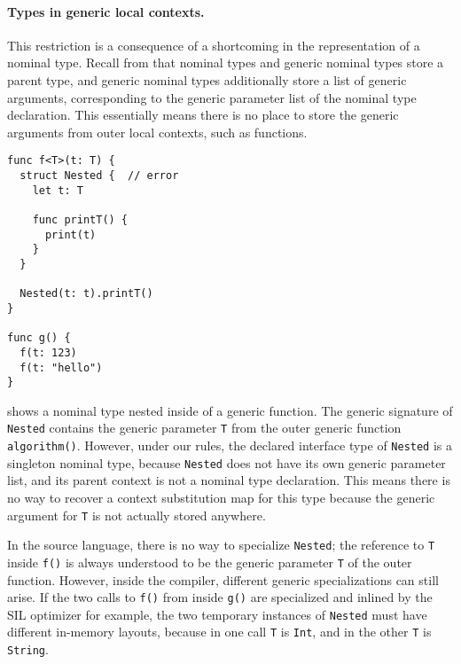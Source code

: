 \documentclass[../generics]{subfiles}
\begin{document}
\paragraph{Types in generic local contexts.} This restriction is a consequence of a shortcoming in the representation of a nominal type. Recall from  that nominal types and generic nominal types store a parent type, and generic nominal types additionally store a list of generic arguments, corresponding to the generic parameter list of the nominal type declaration. This essentially means there is no place to store the generic arguments from outer local contexts, such as functions.

\begin{listing}\label{nominal type in generic local context}
\begin{Verbatim}
func f<T>(t: T) {
  struct Nested {  // error
    let t: T

    func printT() {
      print(t)
    }
  }
  
  Nested(t: t).printT()
}

func g() {
  f(t: 123)
  f(t: "hello")
}
\end{Verbatim}
\end{listing}

 shows a nominal type nested inside of a generic function. The generic signature of \texttt{Nested} contains the generic parameter \texttt{T} from the outer generic function \texttt{algorithm()}. However, under our rules, the declared interface type of \texttt{Nested} is a singleton nominal type, because \texttt{Nested} does not have its own generic parameter list, and its parent context is not a nominal type declaration. This means there is no way to recover a context substitution map for this type because the generic argument for \texttt{T} is not actually stored anywhere.

In the source language, there is no way to specialize \texttt{Nested}; the reference to \texttt{T} inside \texttt{f()} is always understood to be the generic parameter \texttt{T} of the outer function. However, inside the compiler, different generic specializations can still arise. If the two calls to \texttt{f()} from inside \texttt{g()} are specialized and inlined by the SIL optimizer for example, the two temporary instances of \texttt{Nested} must have different in-memory layouts, because in one call \texttt{T} is \texttt{Int}, and in the other \texttt{T} is \texttt{String}.
\end{document}

